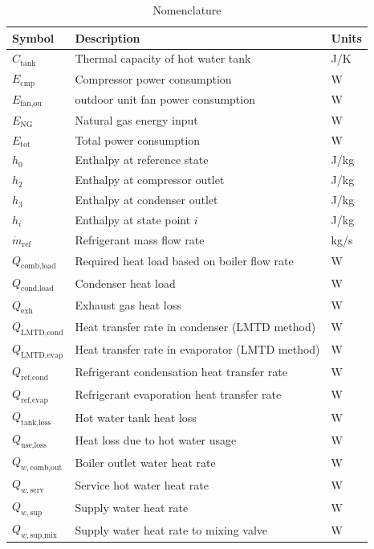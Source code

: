 \documentclass[final,5p,times,twocolumn,authoryear]{elsarticle}
\begin{document}
\begin{table}[htbp]
\centering
\caption{Nomenclature}
\label{tab:nomenclature}
\renewcommand{\arraystretch}{1.2}
\begin{tabularx}{\columnwidth}{l X l}
\toprule
\textbf{Symbol} & \textbf{Description} & \textbf{Units} \\
\midrule
$C_{\text{tank}}$ & Thermal capacity of hot water tank & J/K \\
$E_{\text{cmp}}$ & Compressor power consumption & W \\
$E_{\text{fan,ou}}$ & outdoor unit fan power consumption & W \\
$E_{\text{NG}}$ & Natural gas energy input & W \\
$E_{\text{tot}}$ & Total power consumption & W \\
$h_0$ & Enthalpy at reference state & J/kg \\
$h_2$ & Enthalpy at compressor outlet & J/kg \\
$h_3$ & Enthalpy at condenser outlet & J/kg \\
$h_i$ & Enthalpy at state point $i$ & J/kg \\
$\dot{m}_{\text{ref}}$ & Refrigerant mass flow rate & kg/s \\
$Q_{\text{comb,load}}$ & Required heat load based on boiler flow rate & W \\
$Q_{\text{cond,load}}$ & Condenser heat load & W \\
$Q_{\text{exh}}$ & Exhaust gas heat loss & W \\
$Q_{\text{LMTD,cond}}$ & Heat transfer rate in condenser (LMTD method) & W \\
$Q_{\text{LMTD,evap}}$ & Heat transfer rate in evaporator (LMTD method) & W \\
$Q_{\text{ref,cond}}$ & Refrigerant condensation heat transfer rate & W \\
$Q_{\text{ref,evap}}$ & Refrigerant evaporation heat transfer rate & W \\
$Q_{\text{tank,loss}}$ & Hot water tank heat loss & W \\
$Q_{\text{use,loss}}$ & Heat loss due to hot water usage & W \\
$Q_{w,\text{comb,out}}$ & Boiler outlet water heat rate & W \\
$Q_{w,\text{serv}}$ & Service hot water heat rate & W \\
$Q_{w,\text{sup}}$ & Supply water heat rate & W \\
$Q_{w,\text{sup,mix}}$ & Supply water heat rate to mixing valve & W \\

\end{tabularx}
\end{table}
\end{document}
